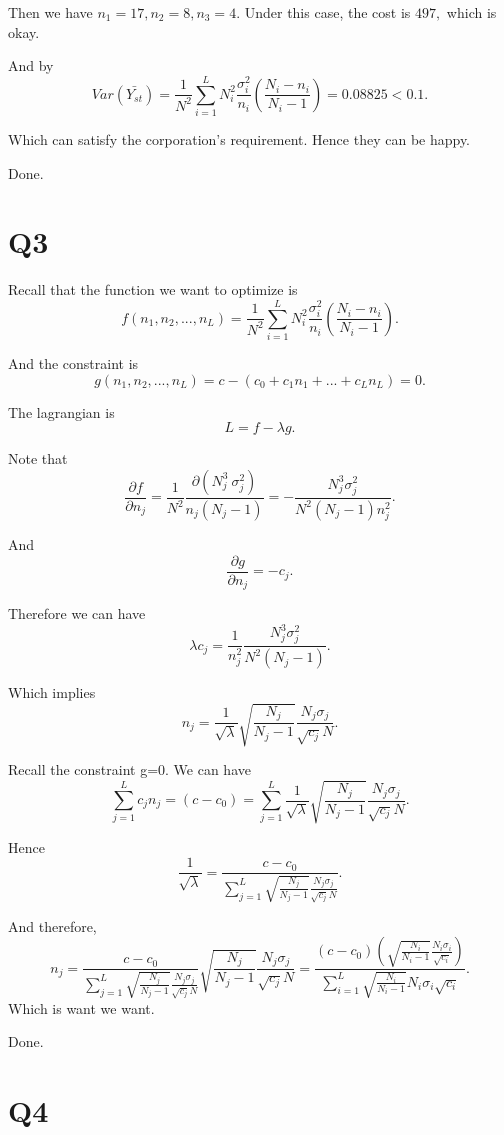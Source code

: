 \documentclass[12pt]{article}%
\begin{document}
Then we have $n_1=17, n_2=8, n_3=4.$ Under this case, the cost is $497,$ which is okay. 

And by $$Var(\bar{Y_{st}})=\frac{1}{N^2}\sum_{i=1}^{L}N_i^2\frac{\sigma_i^2}{n_i}(\frac{N_i-n_i}{N_i-1})=0.08825<0.1.$$

Which can satisfy the corporation's requirement. Hence they can be happy.

Done. 

\section{Q3}
Recall that the function we want to optimize is $$f(n_1,n_2,...,n_L)=\frac{1}{N^2}\sum_{i=1}^{L}N_i^2\frac{\sigma_{i}^2}{n_i}(\frac{N_i-n_i}{N_i-1}).$$

And the constraint is $$g(n_1,n_2,...,n_L)=c-(c_0+c_1n_1+...+c_Ln_L)=0.$$

The lagrangian is $$L=f-\lambda g.$$ 

Note that $$\frac{\partial f}{\partial n_j}=\frac{1}{N^2}\frac{\partial (N_j^3\ \sigma_{j}^2)}{n_j (N_j-1)}=-\frac{N_j^3 \sigma_j^2}{N^2 (N_j-1)n_j^2}.$$

And $$\frac{\partial g}{\partial n_j}=-c_j.$$ 

Therefore we can have $$\lambda c_j = \frac{1}{n_j^2}\frac{N_j^3 \sigma_j^2}{N^2(N_j-1)}.$$ 

Which implies $$n_j=\frac{1}{\sqrt{\lambda}} \sqrt{\frac{N_j}{N_j -1}} \frac{N_j \sigma_j}{\sqrt{c_j} N}.$$

Recall the constraint g=0. We can have $$\sum_{j=1}^{L}c_jn_j=(c-c_0)=\sum_{j=1}^{L} \frac{1}{\sqrt{\lambda}} \sqrt{\frac{N_j}{N_j -1}} \frac{N_j \sigma_j}{\sqrt{c_j} N}.$$

Hence $$\frac{1}{\sqrt{\lambda}}=\frac{c-c_0}{\sum_{j=1}^{L}\sqrt{\frac{N_j}{N_j -1}} \frac{N_j \sigma_j}{\sqrt{c_j} N} } .$$

And therefore, $$n_j=\frac{c-c_0}{\sum_{j=1}^{L}\sqrt{\frac{N_j}{N_j -1}} \frac{N_j \sigma_j}{\sqrt{c_j} N} } \sqrt{\frac{N_j}{N_j -1}} \frac{N_j \sigma_j}{\sqrt{c_j} N}=\frac{(c-c_0)(\sqrt{\frac{N_i}{N_i-1}}\frac{N_i \sigma_i}{\sqrt{c_i}})}{\sum_{i=1}^{L} \sqrt{\frac{N_i}{N_i-1}}N_i \sigma_i \sqrt{c_i} }.$$ Which is want we want. 

Done.

\section{Q4}
\end{document}
